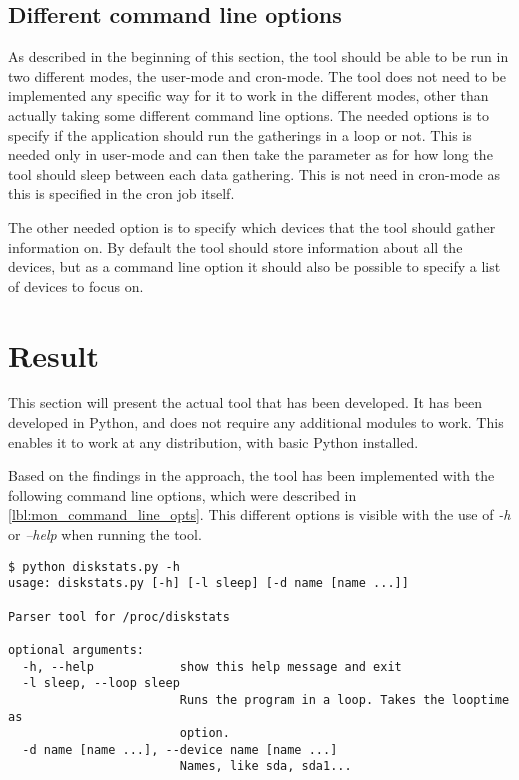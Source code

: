 \subsection{Different command line options}\label{lbl:mon_command_line_opts}
As described in the beginning of this section, the tool should be able to be
run in two different modes, the user-mode and cron-mode. The tool does not need
to be implemented any specific way for it to work in the different modes, other
than actually taking some different command line options.
The needed options is to specify if the application should run the gatherings
in a loop or not. This is needed only in user-mode and can then take the
parameter as for how long the tool should sleep between each data gathering.
This is not need in cron-mode as this is specified in the cron job itself.

The other needed option is to specify which devices that the tool should gather
information on. By default the tool should store information about all the
devices, but as a command line option it should also be possible to specify a
list of devices to focus on. 

\section{Result}
This section will present the actual tool that has been developed. It has been
developed in Python, and does not require any additional modules to work. This
enables it to work at any distribution, with basic Python installed.

Based on the findings in the approach, the tool has been implemented with the
following command line options, which were described in
\vref{lbl:mon_command_line_opts}. This different options is visible with the
use of \textit{-h} or \textit{--help} when running the tool.
\begin{center}
\begin{lstlisting}[label=lbl:diskstats_help,caption=Command line options of
disksts.py,columns=fullflexible,numbers=none]
$ python diskstats.py -h
usage: diskstats.py [-h] [-l sleep] [-d name [name ...]]

Parser tool for /proc/diskstats

optional arguments:
  -h, --help            show this help message and exit
  -l sleep, --loop sleep
                        Runs the program in a loop. Takes the looptime as
                        option.
  -d name [name ...], --device name [name ...]
                        Names, like sda, sda1...
\end{lstlisting}
\end{center}

